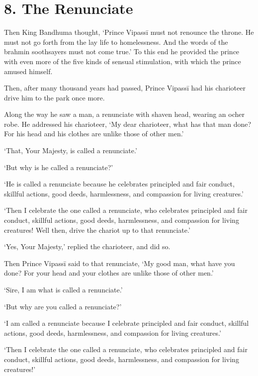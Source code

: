 \documentclass[12pt,openany]{book}%
\begin{document}
\section*{8. The Renunciate }

Then King Bandhuma thought, ‘Prince \textsanskrit{Vipassī} must not renounce the throne. He must not go forth from the lay life to homelessness. And the words of the brahmin soothsayers must not come true.’ To this end he provided the prince with even more of the five kinds of sensual stimulation, with which the prince amused himself. 

Then, after many thousand years had passed, Prince \textsanskrit{Vipassī} had his charioteer drive him to the park once more. 

Along the way he saw a man, a renunciate with shaven head, wearing an ocher robe. He addressed his charioteer, ‘My dear charioteer, what has that man done? For his head and his clothes are unlike those of other men.’ 

‘That, Your Majesty, is called a renunciate.’ 

‘But why is he called a renunciate?’ 

‘He is called a renunciate because he celebrates principled and fair conduct, skillful actions, good deeds, harmlessness, and compassion for living creatures.’ 

‘Then I celebrate the one called a renunciate, who celebrates principled and fair conduct, skillful actions, good deeds, harmlessness, and compassion for living creatures! Well then, drive the chariot up to that renunciate.’ 

‘Yes, Your Majesty,’ replied the charioteer, and did so. 

Then Prince \textsanskrit{Vipassī} said to that renunciate, ‘My good man, what have you done? For your head and your clothes are unlike those of other men.’ 

‘Sire, I am what is called a renunciate.’ 

‘But why are you called a renunciate?’ 

‘I am called a renunciate because I celebrate principled and fair conduct, skillful actions, good deeds, harmlessness, and compassion for living creatures.’ 

‘Then I celebrate the one called a renunciate, who celebrates principled and fair conduct, skillful actions, good deeds, harmlessness, and compassion for living creatures!’ 
\end{document}
